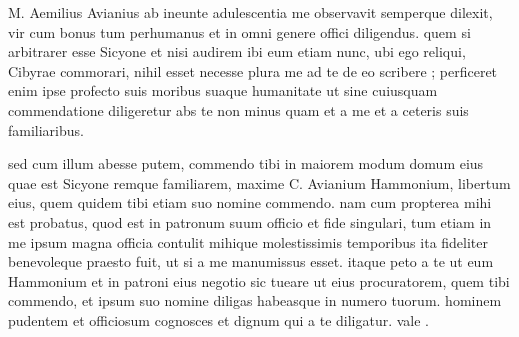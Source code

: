 


 M. Aemilius Avianius ab ineunte adulescentia me observavit semperque dilexit, vir cum bonus tum perhumanus et in omni genere offici diligendus. quem si arbitrarer esse Sicyone et nisi audirem ibi eum etiam nunc, ubi ego reliqui, Cibyrae commorari, nihil esset necesse plura me ad te de eo scribere ; perficeret enim ipse profecto suis moribus suaque humanitate ut sine cuiusquam commendatione diligeretur abs te non minus quam et a me et a ceteris suis familiaribus.

 sed cum illum abesse putem, commendo tibi in maiorem modum domum eius quae est Sicyone remque familiarem, maxime C. Avianium Hammonium, libertum eius, quem quidem tibi etiam suo nomine commendo. nam cum propterea mihi est probatus, quod est in patronum suum officio et fide singulari, tum etiam in me ipsum magna officia contulit mihique molestissimis temporibus ita fideliter benevoleque praesto fuit, ut si a me manumissus esset. itaque peto a te ut eum Hammonium et in patroni eius negotio sic tueare ut eius procuratorem, quem tibi commendo, et ipsum suo nomine diligas habeasque in numero tuorum. hominem pudentem et officiosum cognosces et dignum qui a te diligatur. vale .
